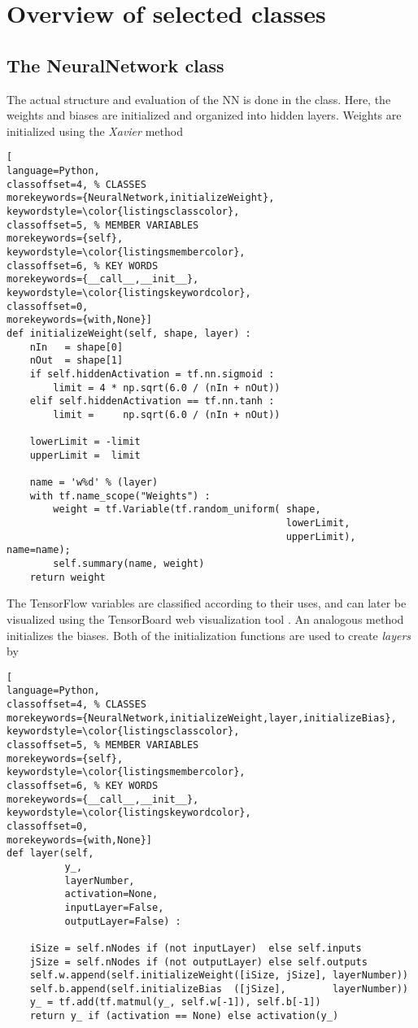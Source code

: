 \documentclass[../../master.tex]{subfiles}
\begin{document}
\section{Overview of selected classes}
\subsection{The NeuralNetwork class}
The actual structure and evaluation of the NN is done in the  class. Here, the weights and biases are initialized and organized into hidden layers. Weights are initialized using the \emph{Xavier} method \cite{glorot2010understanding}
\begin{lstlisting}[
language=Python,
classoffset=4, % CLASSES
morekeywords={NeuralNetwork,initializeWeight},
keywordstyle=\color{listingsclasscolor},
classoffset=5, % MEMBER VARIABLES
morekeywords={self},
keywordstyle=\color{listingsmembercolor},
classoffset=6, % KEY WORDS
morekeywords={__call__,__init__},
keywordstyle=\color{listingskeywordcolor},
classoffset=0,
morekeywords={with,None}]
def initializeWeight(self, shape, layer) :
    nIn   = shape[0]
    nOut  = shape[1]
    if self.hiddenActivation = tf.nn.sigmoid :
        limit = 4 * np.sqrt(6.0 / (nIn + nOut))
    elif self.hiddenActivation == tf.nn.tanh :
        limit =     np.sqrt(6.0 / (nIn + nOut))
      
    lowerLimit = -limit
    upperLimit =  limit

    name = 'w%d' % (layer)
    with tf.name_scope("Weights") :
        weight = tf.Variable(tf.random_uniform( shape, 
                                                lowerLimit, 
                                                upperLimit), name=name); 
        self.summary(name, weight)
    return weight
\end{lstlisting}
The TensorFlow variables are classified according to their uses, and can later be visualized using the TensorBoard web visualization tool \cite{tensorboard}. An analogous method initializes the biases. Both of the initialization functions are used to create \emph{layers} by
\begin{lstlisting}[
language=Python,
classoffset=4, % CLASSES
morekeywords={NeuralNetwork,initializeWeight,layer,initializeBias},
keywordstyle=\color{listingsclasscolor},
classoffset=5, % MEMBER VARIABLES
morekeywords={self},
keywordstyle=\color{listingsmembercolor},
classoffset=6, % KEY WORDS
morekeywords={__call__,__init__},
keywordstyle=\color{listingskeywordcolor},
classoffset=0,
morekeywords={with,None}]
def layer(self, 
          y_,
          layerNumber, 
          activation=None, 
          inputLayer=False, 
          outputLayer=False) :

    iSize = self.nNodes if (not inputLayer)  else self.inputs
    jSize = self.nNodes if (not outputLayer) else self.outputs
    self.w.append(self.initializeWeight([iSize, jSize], layerNumber))
    self.b.append(self.initializeBias  ([jSize],        layerNumber))
    y_ = tf.add(tf.matmul(y_, self.w[-1]), self.b[-1])
    return y_ if (activation == None) else activation(y_)
\end{lstlisting}
\end{document}
